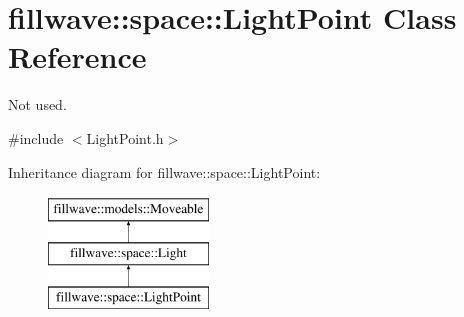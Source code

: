 \hypertarget{classfillwave_1_1space_1_1LightPoint}{}\section{fillwave\+:\+:space\+:\+:Light\+Point Class Reference}
\label{classfillwave_1_1space_1_1LightPoint}


Not used.  




{\ttfamily \#include $<$Light\+Point.\+h$>$}

Inheritance diagram for fillwave\+:\+:space\+:\+:Light\+Point\+:\begin{figure}[H]
\begin{center}
\leavevmode
\includegraphics[height=3.000000cm]{classfillwave_1_1space_1_1LightPoint}
\end{center}
\end{figure}
